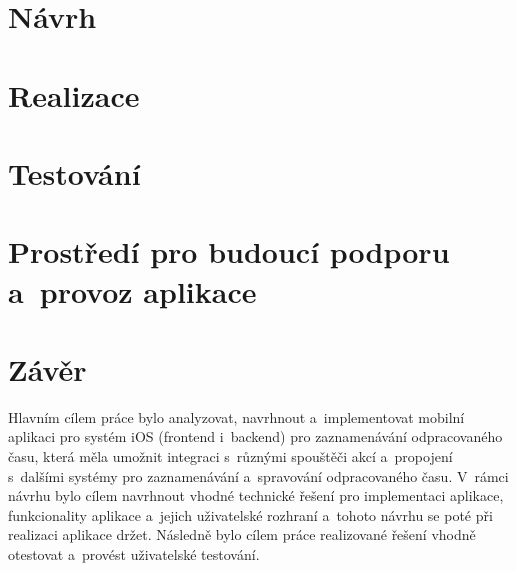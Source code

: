 

\chapter{Návrh}



\chapter{Realizace}



\chapter{Testování}



\chapter{Prostředí pro budoucí podporu a~provoz aplikace}



\chapter*{Závěr}

Hlavním cílem práce bylo analyzovat, navrhnout a~implementovat mobilní aplikaci pro systém iOS (frontend i~backend) pro zaznamenávání odpracovaného času, která měla umožnit integraci s~různými spouštěči akcí a~propojení s~dalšími systémy pro zaznamenávání a~spravování odpracovaného času. V~rámci návrhu bylo cílem navrhnout vhodné technické řešení pro implementaci aplikace, funkcionality aplikace a~jejich uživatelské rozhraní a~tohoto návrhu se poté při realizaci aplikace držet. Následně bylo cílem práce realizované řešení vhodně otestovat a~provést uživatelské testování. 

